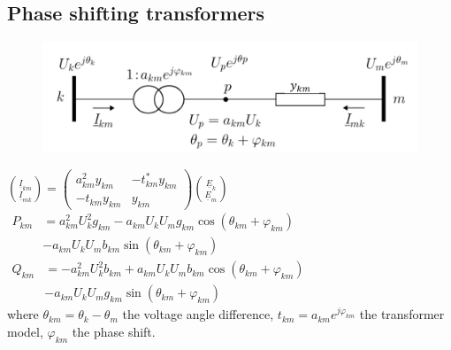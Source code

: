 \documentclass[a4paper,10pt,landscape]{scrartcl}
\begin{document}
\begin{multicols*}{3}
\subsection{Phase shifting transformers}
\begin{figure}[H]
    \centering
    \includegraphics[width=\linewidth]{src/image.png}
\end{figure}
$\binom{\underline{I}_{k m}}{\underline{I}_{m k}}=\left(\begin{array}{cc}a_{k m}^2 y_{k m} & -t_{k m}^* y_{k m} \\ -t_{k m} y_{k m} & y_{k m}\end{array}\right)\binom{\underline{E}_k}{\underline{E}_m}$ \\
$\begin{aligned} P_{k m} & =a_{k m}^2 U_k^2 g_{k m}-a_{k m} U_k U_m g_{k m} \cos \left(\theta_{k m}+\varphi_{k m}\right) \\ & -a_{k m} U_k U_m b_{k m} \sin \left(\theta_{k m}+\varphi_{k m}\right)\end{aligned}$
$\begin{aligned} Q_{k m} & =-a_{k m}^2 U_k^2 b_{k m}+a_{k m} U_k U_m b_{k m} \cos \left(\theta_{k m}+\varphi_{k m}\right) \\ & -a_{k m} U_k U_m g_{k m} \sin \left(\theta_{k m}+\varphi_{k m}\right)\end{aligned}$ \\
where $\theta_{km}=\theta_k-\theta_m$ the voltage angle difference, $t_{km}=a_{km}e^{j\varphi_{km}}$ the transformer model, $\varphi_{km}$ the phase shift.



\end{multicols*}
\end{document}
